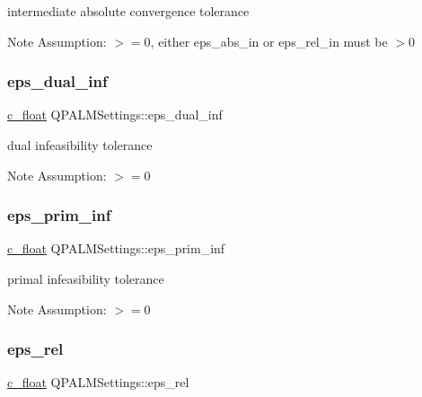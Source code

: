 intermediate absolute convergence tolerance 

\begin{DoxyNote}{Note}
Assumption\+: $>=0$, either eps\+\_\+abs\+\_\+in or eps\+\_\+rel\+\_\+in must be $>0$ 
\end{DoxyNote}
\mbox{\label{structQPALMSettings_a2a5fb667474a46bcc38c61b0470965e6}} 
\subsubsection{\texorpdfstring{eps\_dual\_inf}{eps\_dual\_inf}}
{\footnotesize\ttfamily \mbox{\hyperlink{global__opts_8h_a7f1a9fda95e52979658c20a0d134fb15}{c\+\_\+float}} Q\+P\+A\+L\+M\+Settings\+::eps\+\_\+dual\+\_\+inf}



dual infeasibility tolerance 

\begin{DoxyNote}{Note}
Assumption\+: $>=0$ 
\end{DoxyNote}
\mbox{\label{structQPALMSettings_a79fa6519420bf0a0078a67a4d9bb57f3}} 
\subsubsection{\texorpdfstring{eps\_prim\_inf}{eps\_prim\_inf}}
{\footnotesize\ttfamily \mbox{\hyperlink{global__opts_8h_a7f1a9fda95e52979658c20a0d134fb15}{c\+\_\+float}} Q\+P\+A\+L\+M\+Settings\+::eps\+\_\+prim\+\_\+inf}



primal infeasibility tolerance 

\begin{DoxyNote}{Note}
Assumption\+: $>=0$ 
\end{DoxyNote}
\mbox{\label{structQPALMSettings_a9b84087d61f10c22632bd6924e33691c}} 
\subsubsection{\texorpdfstring{eps\_rel}{eps\_rel}}
{\footnotesize\ttfamily \mbox{\hyperlink{global__opts_8h_a7f1a9fda95e52979658c20a0d134fb15}{c\+\_\+float}} Q\+P\+A\+L\+M\+Settings\+::eps\+\_\+rel}



